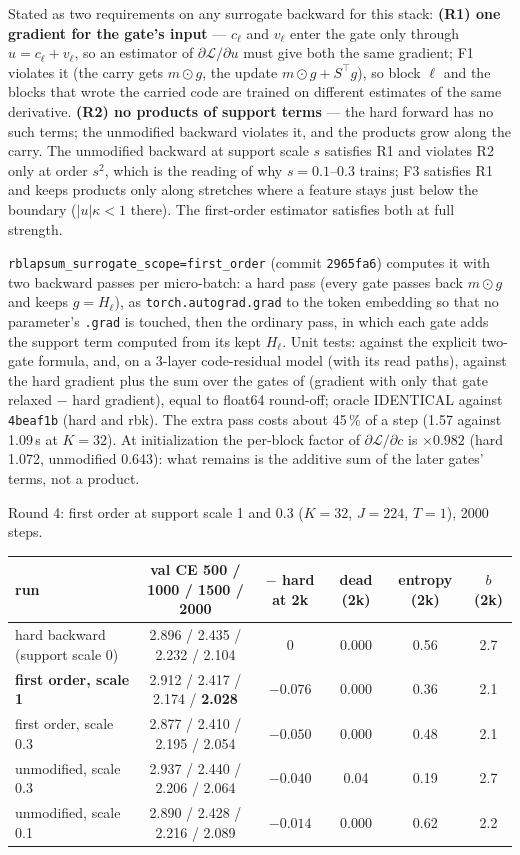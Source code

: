 \documentclass[11pt,a4paper]{article}
\newcommand{\code}[1]{\texttt{#1}}
\begin{document}
Stated as two requirements on any surrogate backward for this stack: \textbf{(R1) one gradient for the gate's
input} --- \(c_\ell\) and \(v_\ell\) enter the gate only through \(u=c_\ell+v_\ell\), so an estimator of
\(\partial\mathcal L/\partial u\) must give both the same gradient; F1 violates it (the carry gets \(m\odot g\), the update
\(m\odot g+S^\top g\)), so block \(\ell\) and the blocks that wrote the carried code are trained on different estimates
of the same derivative.  \textbf{(R2) no products of support terms} --- the hard forward has no such terms; the
unmodified backward violates it, and the products grow along the carry.  The unmodified backward at support scale
\(s\) satisfies R1 and violates R2 only at order \(s^2\), which is the reading of why \(s=0.1\)--0.3 trains; F3 satisfies
R1 and keeps products only along stretches where a feature stays just below the boundary
(\(|u|\kappa<1\) there).  The first-order estimator satisfies both at full strength.

\code{rblapsum\_surrogate\_scope=first\_order} (commit \code{2965fa6}) computes it with two backward passes per
micro-batch: a hard pass (every gate passes back \(m\odot g\) and keeps \(g=H_\ell\)), as
\code{torch.autograd.grad} to the token embedding so that no parameter's \texttt{.grad} is touched, then the
ordinary pass, in which each gate adds the support term computed from its kept \(H_\ell\).  Unit tests: against the
explicit two-gate formula, and, on a 3-layer code-residual model (with its read paths), against the hard gradient
plus the sum over the gates of (gradient with only that gate relaxed \(-\) hard gradient), equal to float64
round-off; oracle IDENTICAL against \code{4beaf1b} (hard and rbk).  The extra pass costs about 45\,\%
of a step (1.57 against 1.09\,s at \(K=32\)).  At initialization the per-block factor
of \(\partial\mathcal L/\partial c\) is \(\times0.982\) (hard 1.072, unmodified 0.643): what remains is the additive
sum of the later gates' terms, not a product.

Round 4: first order at support scale 1 and 0.3 (\(K=32\), \(J=224\), \(T=1\)), 2000 steps.

\begin{center}\small
\begin{tabular}{lccccc}
\toprule
run & val CE 500 / 1000 / 1500 / 2000 & \(-\) hard at 2k & dead (2k) & entropy (2k) & \(b\) (2k) \\
\midrule
hard backward (support scale 0)   & 2.896 / 2.435 / 2.232 / 2.104 & 0 & 0.000 & 0.56 & 2.7 \\
\textbf{first order, scale 1}     & 2.912 / 2.417 / 2.174 / \textbf{2.028} & \(\mathbf{-0.076}\) & 0.000 & 0.36 & 2.1 \\
first order, scale 0.3            & 2.877 / 2.410 / 2.195 / 2.054 & \(-0.050\) & 0.000 & 0.48 & 2.1 \\
unmodified, scale 0.3             & 2.937 / 2.440 / 2.206 / 2.064 & \(-0.040\) & 0.04 & 0.19 & 2.7 \\
unmodified, scale 0.1             & 2.890 / 2.428 / 2.216 / 2.089 & \(-0.014\) & 0.000 & 0.62 & 2.2 \\
\bottomrule
\end{tabular}
\end{center}
\end{document}

